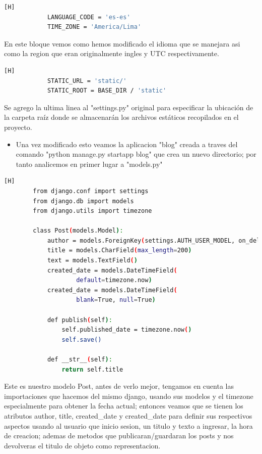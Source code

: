 \documentclass{article}
\begin{document}
	\begin{lstlisting}[language=bash,caption={Settings.py - cambio de idioma y region}][H]
            LANGUAGE_CODE = 'es-es'
            TIME_ZONE = 'America/Lima'
	\end{lstlisting}
        En este bloque vemos como hemos modificado el idioma que se manejara asi como la region que eran originalmente ingles y UTC respectivamente.

        \begin{lstlisting}[language=bash,caption={Settings.py - cambio 3}][H]
            STATIC_URL = 'static/'
            STATIC_ROOT = BASE_DIR / 'static'
	\end{lstlisting}
        Se agrego la ultima linea al "settings.py" original para especificar la ubicación de la carpeta raíz donde se almacenarán los archivos estáticos recopilados en el proyecto.
        
        \begin{itemize}	
    		\item Una vez modificado esto veamos la aplicacion "blog" creada a traves del comando "python manage.py startapp blog" que crea un nuevo directorio; por tanto analicemos en primer lugar a "models.py"
        \end{itemize}
        \begin{lstlisting}[language=bash,caption={bloque4}][H]
        from django.conf import settings
        from django.db import models
        from django.utils import timezone
        
        class Post(models.Model):
            author = models.ForeignKey(settings.AUTH_USER_MODEL, on_delete=models.CASCADE)
            title = models.CharField(max_length=200)
            text = models.TextField()
            created_date = models.DateTimeField(
                    default=timezone.now)
            created_date = models.DateTimeField(
                    blank=True, null=True)
        
            def publish(self):
                self.published_date = timezone.now()
                self.save()
        
            def __str__(self):
                return self.title
	\end{lstlisting}
    Este es nuestro modelo Post, antes de verlo mejor, tengamos en cuenta las importaciones que hacemos del mismo django, usando sus modelos y el timezone especialmente para obtener
    la fecha actual; entonces veamos que se tienen los atributos author, title, created\_date  y created\_date para definir sus respectivos aspectos usando al usuario que inicio sesion, un titulo y texto a ingresar, la hora de creacion; ademas de metodos que publicaran/guardaran los posts y nos devolveras el titulo de objeto como representacion.
\end{document}
